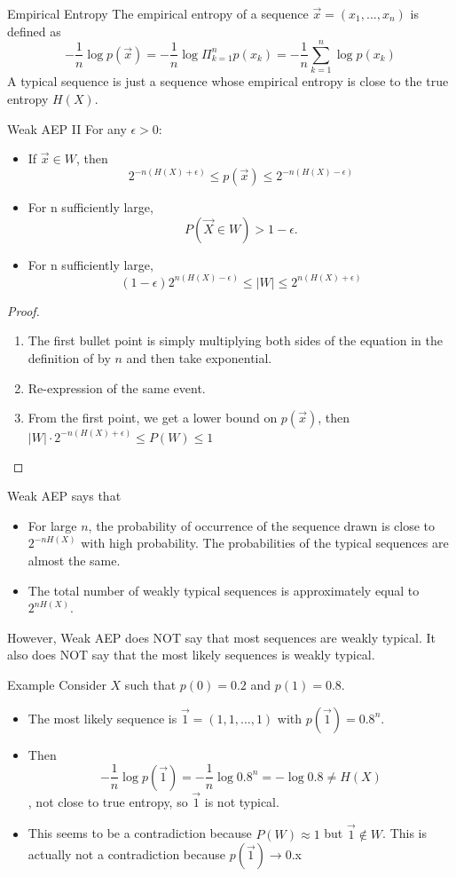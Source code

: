 \documentclass[../main.tex]{subfiles}
\begin{document}
\begin{gbox}{Empirical Entropy}
    The empirical entropy of a sequence $\vec x = (x_1,...,x_n)$ is defined as \begin{equation*}
        -\frac{1}{n}\log p(\vec x)=-\frac{1}{n}\log \Pi_{k=1}^np(x_k) = -\frac{1}{n}\sum_{k=1}^n \log p(x_k)   \end{equation*}
    A typical sequence is just a sequence whose empirical entropy is close to the true entropy $H(X)$.
\end{gbox}
\begin{bbox}{Weak AEP II}
For any $\epsilon > 0$:
\begin{itemize}
    \item If $\vec x\in W$, then \[
    2^{-n(H(X)+\epsilon)}\leq p(\vec x)\leq 2^{-n(H(X)-\epsilon)}
    \]
    \item For n sufficiently large, \[
    P(\vec X\in W) > 1-\epsilon.\]
    \item For n sufficiently large, \[
    (1-\epsilon)2^{n(H(X)-\epsilon)}\leq |W|\leq 2^{n(H(X)+\epsilon)}
    \]
    
\end{itemize}
\begin{proof}
    \begin{enumerate}
        \item The first bullet point is simply multiplying both sides of the equation in the definition of by $n$ and then take exponential.
        \item Re-expression of the same event.
        \item From the first point, we get a lower bound on $p(\vec x)$, then $|W|\cdot 2^{-n(H(X)+\epsilon)} \leq P(W)\leq 1$
    \end{enumerate}
\end{proof}
\end{bbox}
Weak AEP says that 
\begin{itemize}
    \item For large $n$, the probability of occurrence of the sequence drawn is close to $2^{-nH(X)}$ with high probability. The probabilities of the typical sequences are almost the same.
    \item The total number of weakly typical sequences is approximately equal to $2^{nH(X)}$.
\end{itemize}
However, Weak AEP does NOT say that most sequences are weakly typical. It also does NOT  say that the most likely sequences is weakly typical.
\begin{pbox}{Example}
    Consider $X$ such that $p(0)=0.2$ and $p(1)=0.8$.
    \begin{itemize}
        \item The most likely sequence is $\vec 1 = (1,1,\dots, 1)$ with $p(\vec 1) = 0.8^n$.
        \item Then \[-\frac{1}{n}\log p(\vec 1)=-\frac{1}{n}\log 0.8^n =-\log 0.8\neq H(X)    
        \], not close to true entropy, so $\vec 1$ is not typical.
        \item This seems to be a contradiction because $P(W)\approx 1$ but $\vec 1\notin W$. This is actually not a contradiction because $p(\vec 1)\to 0$.x
        \end{itemize}
\end{pbox}
\end{document}
